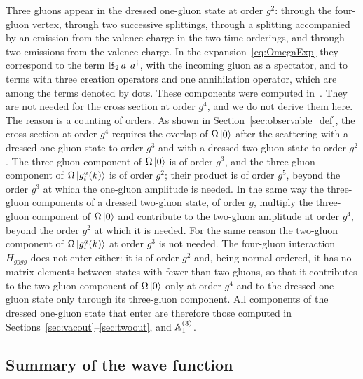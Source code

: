 Three gluons appear in the dressed one-gluon state at order $g^2$: through the four-gluon vertex, through two successive splittings, through a splitting accompanied by an emission from the valence charge in the two time orderings, and through two emissions from the valence charge. In the expansion~\eqref{eq:OmegaExp} they correspond to the term $\mathbb{B}_2\,a^\dagger a^\dagger$, with the incoming gluon as a spectator, and to terms with three creation operators and one annihilation operator, which are among the terms denoted by dots. These components were computed in~\cite{Radhakrishnan:2026soft}. They are not needed for the cross section at order $g^4$, and we do not derive them here. The reason is a counting of orders. As shown in Section~\ref{sec:observable_def}, the cross section at order $g^4$ requires the overlap of $\Omega\ket0$ after the scattering with a dressed one-gluon state to order $g^3$ and with a dressed two-gluon state to order $g^2$. The three-gluon component of $\Omega\ket0$ is of order $g^3$, and the three-gluon component of $\Omega\ket{g^a_i(k)}$ is of order $g^2$; their product is of order $g^5$, beyond the order $g^3$ at which the one-gluon amplitude is needed. In the same way the three-gluon components of a dressed two-gluon state, of order $g$, multiply the three-gluon component of $\Omega\ket0$ and contribute to the two-gluon amplitude at order $g^4$, beyond the order $g^2$ at which it is needed. For the same reason the two-gluon component of $\Omega\ket{g^a_i(k)}$ at order $g^3$ is not needed. The four-gluon interaction $H_{gggg}$ does not enter either: it is of order $g^2$ and, being normal ordered, it has no matrix elements between states with fewer than two gluons, so that it contributes to the two-gluon component of $\Omega\ket0$ only at order $g^4$ and to the dressed one-gluon state only through its three-gluon component. All components of the dressed one-gluon state that enter are therefore those computed in Sections~\ref{sec:vacout}--\ref{sec:twoout}, and $\mathbb{A}^{(3)}_1$.

\subsection{Summary of the wave function}\label{sec:summarywf}

